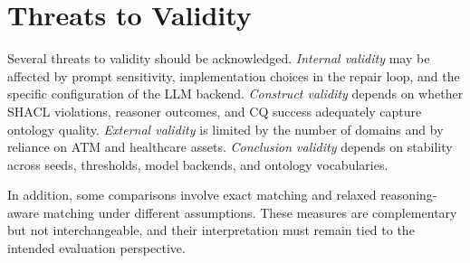 \section{Threats to Validity}

Several threats to validity should be acknowledged. \emph{Internal validity} may be affected by prompt sensitivity, implementation choices in the repair loop, and the specific configuration of the LLM backend. \emph{Construct validity} depends on whether SHACL violations, reasoner outcomes, and CQ success adequately capture ontology quality. \emph{External validity} is limited by the number of domains and by reliance on ATM and healthcare assets. \emph{Conclusion validity} depends on stability across seeds, thresholds, model backends, and ontology vocabularies.

In addition, some comparisons involve exact matching and relaxed reasoning-aware matching under different assumptions. These measures are complementary but not interchangeable, and their interpretation must remain tied to the intended evaluation perspective.
